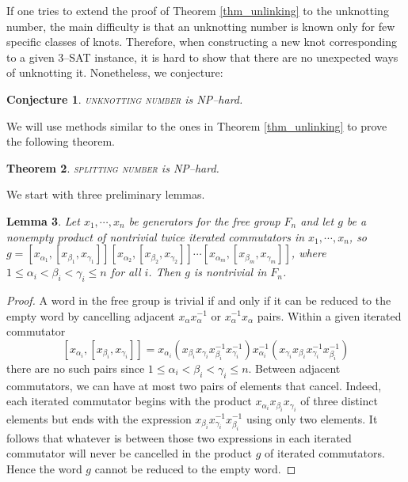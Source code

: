 \documentclass[12pt]{amsart}
\newtheorem{thm}{Theorem}
\newtheorem{conj}[thm]{Conjecture}
\newtheorem{lemma}[thm]{Lemma}
\theoremstyle{definition}
\theoremstyle{remark}
\begin{document}
If one tries to extend the proof of Theorem \ref{thm_unlinking} to the unknotting number, the main difficulty is that an unknotting number is known only for few specific classes of knots.
Therefore, when constructing a new knot corresponding to a given 3--\textsc{SAT} instance, it is hard to show that there are no unexpected ways of unknotting it.
Nonetheless, we conjecture:

\begin{conj} \textsc{unknotting number} is NP--hard.
\end{conj}

We will use methods similar to the ones in Theorem \ref{thm_unlinking} to prove the following theorem.

\begin{thm}
\textsc{splitting number} is NP--hard.
\label{thm_splitting}
\end{thm}

 We start with three preliminary lemmas.

\begin{lemma}
Let $x_1, \cdots , x_n$ be generators for the free group $F_n$ and let $g$ be a nonempty product of nontrivial twice iterated commutators in $x_1, \cdots, x_n$, so $g = [x_{\alpha_1}, [ x_{\beta_1}, x_{\gamma_1}]][x_{\alpha_2}, [ x_{\beta_2}, x_{\gamma_2}]] \cdots  [x_{\alpha_m}, [ x_{\beta_m}, x_{\gamma_m}]]$, where $1 \le \alpha_i < \beta_i < \gamma_i \le n$ for all $i$.
Then $g$ is nontrivial in $F_n$.
\label{lem_freeword}
\end{lemma}

\begin{proof}
A word in the free group is trivial if and only if it can be reduced to the empty word by cancelling adjacent $x_\alpha x_\alpha^{-1}$ or $x_\alpha^{-1}x_\alpha$ pairs.
Within a given iterated commutator $$[x_{\alpha_i}, [ x_{\beta_i}, x_{\gamma_i}]]  = x_{\alpha_i}(x_{\beta_i}x_{\gamma_i}x_{\beta_i}^{-1}x_{\gamma_i}^{-1})x_{\alpha_i}^{-1}(x_{\gamma_i}x_{\beta_i}x_{\gamma_i}^{-1}x_{\beta_i}^{-1})$$ there are no such pairs since $1 \le \alpha_i < \beta_i < \gamma_i \le n$.
Between adjacent commutators, we can have at most two pairs of elements that cancel.
Indeed, each iterated commutator begins with the product $x_{\alpha_i}x_{\beta_i}x_{\gamma_i}$ of three distinct elements but ends with the expression $x_{\beta_i}x_{\gamma_i}^{-1}x_{\beta_i}^{-1}$ using only two elements.
It follows that whatever is between those two expressions in each iterated commutator will never be cancelled in the product $g$ of iterated commutators.
Hence the word $g$ cannot be reduced to the empty word.
\end{proof}
\end{document}
